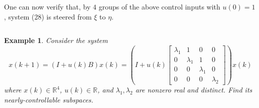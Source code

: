 \documentclass[journal,a4paper,12pt,onecolumn]{IEEEtran}
\newtheorem{example}[theorem]{Example}
\begin{document}
One can now verify that, by $4$ groups of the above control inputs with $u\left( 0\right) =1$, system (28) is steered from $\xi $ to $\eta $.

$\left. {}\right. $

\begin{example}
Consider the system\begin{equation}
x\left( k+1\right) =\left( I+u\left( k\right) B\right) x\left( k\right)
=\left( I+u\left( k\right) \left[
\begin{array}{cccc}
\lambda _{1} & 1 & 0 & 0 \\
0 & \lambda _{1} & 1 & 0 \\
0 & 0 & \lambda _{1} & 0 \\
0 & 0 & 0 & \lambda _{2}\end{array}\right] \right) x\left( k\right)
\end{equation}where $x\left( k\right) \in
\mathbb{R}
^{4}$, $u(k)\in
\mathbb{R}
$, and $\lambda _{1},\lambda _{2}$ are nonzero real and distinct. Find its
nearly-controllable subspaces.
\end{example}

$\left. {}\right. $
\end{document}
